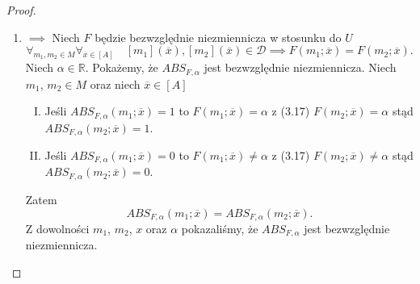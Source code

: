 \documentclass[12pt,a4paper]{report}
\newcommand{\domkniecie}[1]{\left\lbrack{#1}\right\rbrack}
\begin{document}
\begin{proof}
\begin{enumerate}
\item
$\implies$
Niech $F$ będzie bezwzględnie niezmiennicza w stosunku do $U$ 
\begin{equation}
\forall_{m_{1}, m_{2} \in M}  \forall_{\overline{x} \in \domkniecie{A}} \quad \domkniecie{m_1}(\overline{x}), \domkniecie{m_2}(\overline{x})\in \mathcal{D} \implies F(m_{1};\overline{x})=F(m_{2};\overline{x}).
\end{equation}
Niech $\alpha \in \mathbb{R}$. Pokażemy, że $ABS_{F,\alpha}$ jest bezwzględnie niezmiennicza. Niech $m_1$, $m_2 \in M$ oraz niech $\overline{x} \in \domkniecie{A}$ 
\begin{enumerate}[I.]
\item
Jeśli $ABS_{F,\alpha}(m_1;\overline{x})=1$ to $F(m_1;\overline{x})=\alpha$ z (3.17) $F(m_2;\overline{x})=\alpha$ stąd $ABS_{F,\alpha}(m_2;\overline{x})=1$.
\item
Jeśli $ABS_{F,\alpha}(m_1;\overline{x})=0$ to $F(m_1;\overline{x})\ne \alpha$ z (3.17) $F(m_2;\overline{x})\ne\alpha$ stąd $ABS_{F,\alpha}(m_2;\overline{x})=0$.
\end{enumerate}
Zatem 
$$
ABS_{F,\alpha}(m_1;\overline{x})=ABS_{F,\alpha}(m_2;\overline{x}).
$$
Z dowolności $m_1$, $m_2$, $x$ oraz $\alpha$ pokazaliśmy, że $ABS_{F,\alpha}$ jest bezwzględnie niezmiennicza.


\end{enumerate}
\end{proof}
\end{document}
